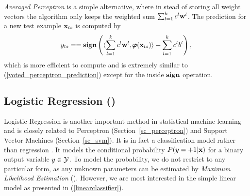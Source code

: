 {\textit{Averaged Perceptron} is a simple alternative, where in stead of storing all weight vectors the algorithm only keeps the weighted sum $\sum_{l=1}^{k}c^l\mathbf {w}^l$. 
The prediction for a new test example $\mathbf {x}_{ts}$ is computed by 
\begin{align*}
	y_{ts} = 
	= \textbf{sign}\left({{\langle \sum_{l=1}^{k}c^l\mathbf {w}^l, \pmb \varphi(\mathbf {x}_{ts}) \rangle+\sum_{l=1}^{k}c^lb^{l}}}\right),
\end{align*}
which is more efficient to compute and is extremely similar to (\ref{voted_perceptron_prediction}) except for the inside $\textbf{sign}$ operation.

%
\subsection{Logistic Regression (\lr)}\label{sc_lr}

Logistic Regression is another important method in statistical machine learning and is closely related to Perceptron (Section~\ref{sc_perceptron}) and Support Vector Machines (Section~\ref{sc_svm}).
It is in fact a classification model rather than regression \citep{Bishop07}.
It models the conditional probability $P(y=+1|\mathbf {x})$ for a binary output variable $y\in\mathcal{Y}$.
To model the probability, we do not restrict to any particular form, as any unknown parameters can be estimated by \textit{Maximum Likelihood Estimation} (\mle).
However, we are most interested in the simple linear model as presented in (\ref{linearclassifier}).

}
